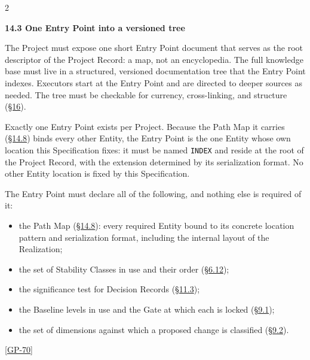 \begin{multicols}{2}
\hypertarget{nss-14.3}{}

\par\smallskip\noindent\textbf{14.3 One Entry Point into a versioned tree}\par\nopagebreak

The Project must expose one short Entry Point document that serves as the root descriptor of the Project Record: a map, not an encyclopedia. The full knowledge base must live in a structured, versioned documentation tree that the Entry Point indexes. Executors start at the Entry Point and are directed to deeper sources as needed. The tree must be checkable for currency, cross-linking, and structure (\hyperlink{nss-16}{\S16}).

Exactly one Entry Point exists per Project. Because the Path Map it carries (\hyperlink{nss-14.8}{\S14.8}) binds every other Entity, the Entry Point is the one Entity whose own location this Specification fixes: it must be named \texttt{INDEX} and reside at the root of the Project Record, with the extension determined by its serialization format. No other Entity location is fixed by this Specification.

The Entry Point must declare all of the following, and nothing else is required of it:

\begin{itemize}\setlength{\itemsep}{0pt}\setlength{\parskip}{0pt}

\item the Path Map (\hyperlink{nss-14.8}{\S14.8}): every required Entity bound to its concrete location pattern and serialization format, including the internal layout of the Realization;

\item the set of Stability Classes in use and their order (\hyperlink{nss-6.12}{\S6.12});

\item the significance test for Decision Records (\hyperlink{nss-11.3}{\S11.3});

\item the Baseline levels in use and the Gate at which each is locked (\hyperlink{nss-9.1}{\S9.1});

\item the set of dimensions against which a proposed change is classified (\hyperlink{nss-9.2}{\S9.2}).

\end{itemize}

[\hyperlink{gp-70}{GP-70}]


\end{multicols}
